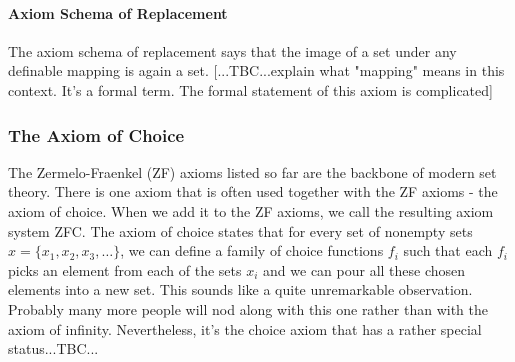 
\paragraph{Axiom Schema of Replacement} The axiom schema of replacement says that the image of a set under any definable mapping is again a set. [...TBC...explain what "mapping" means in this context. It's a formal term. The formal statement of this axiom is complicated]


\subsubsection{The Axiom of Choice}
The Zermelo-Fraenkel (ZF) axioms listed so far are the backbone of modern set theory. There is one axiom that is often used together with the ZF axioms - the axiom of choice. When we add it to the ZF axioms, we call the resulting axiom system ZFC. The axiom of choice states that for every set of nonempty sets $x = \{ x_1, x_2, x_3, \ldots \}$, we can define a family of choice functions $f_i$ such that each $f_i$ picks an element from each of the sets $x_i$ and we can pour all these chosen elements into a new set. This sounds like a quite unremarkable observation. Probably many more people will nod along with this one rather than with the axiom of infinity. Nevertheless, it's the choice axiom that has a rather special status...TBC...






